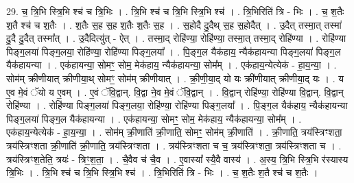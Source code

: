 \documentclass[17pt]{extarticle}
\begin{document}
29. च॒ त्रि॒भि स्त्रि॒भि श्च॑ च त्रि॒भिः । . त्रि॒भि श्च॑ च त्रि॒भि स्त्रि॒भि श्च॑ । . त्रि॒भिरिति॑ त्रि - भिः । . च॒ श॒तैः श॒तै श्च॑ च श॒तैः । . श॒तैः स॒ह स॒ह श॒तैः श॒तैः स॒ह । . स॒होदै दु॒दैथ् स॒ह स॒होदैत् । . उ॒दैत् तस्मा॒त् तस्मा॑ दु॒दै दु॒दैत् तस्मा᳚त् । . उ॒दैदित्यु॑त् - ऐत् । . तस्मा॒द् रोहि॑ण्या॒ रोहि॑ण्या॒ तस्मा॒त् तस्मा॒द् रोहि॑ण्या । . रोहि॑ण्या पिङ्ग॒लया॑ पिङ्ग॒लया॒ रोहि॑ण्या॒ रोहि॑ण्या पिङ्ग॒लया᳚ । . पि॒ङ्ग॒ल यैक॑हाय॒ न्यैक॑हायन्या पिङ्ग॒लया॑ पिङ्ग॒ल यैक॑हायन्या । . एक॑हायन्या॒ सोमꣳ॒॒ सोम॒ मेक॑हाय॒ न्यैक॑हायन्या॒ सोम᳚म् । . एक॑हाय॒न्येत्येक॑ - हा॒य॒न्या॒ । . सोम॑म् क्रीणीयात् क्रीणीया॒थ् सोमꣳ॒॒ सोम॑म् क्रीणीयात् । . क्री॒णी॒या॒द् यो यः क्री॑णीयात् क्रीणीया॒द् यः । . य ए॒व मे॒वं ॅयो य ए॒वम् । . ए॒वं ॅवि॒द्वान्. वि॒द्वा ने॒व मे॒वं ॅवि॒द्वान् । . वि॒द्वान् रोहि॑ण्या॒ रोहि॑ण्या वि॒द्वान्. वि॒द्वान् रोहि॑ण्या । . रोहि॑ण्या पिङ्ग॒लया॑ पिङ्ग॒लया॒ रोहि॑ण्या॒ रोहि॑ण्या पिङ्ग॒लया᳚ । . पि॒ङ्ग॒ल यैक॑हाय॒ न्यैक॑हायन्या पिङ्ग॒लया॑ पिङ्ग॒ल यैक॑हायन्या । . एक॑हायन्या॒ सोमꣳ॒॒ सोम॒ मेक॑हाय॒ न्यैक॑हायन्या॒ सोम᳚म् । . एक॑हाय॒न्येत्येक॑ - हा॒य॒न्या॒ । . सोम॑म् क्री॒णाति॑ क्री॒णाति॒ सोमꣳ॒॒ सोम॑म् क्री॒णाति॑ । . क्री॒णाति॒ त्रय॑स्त्रिꣳशता॒ त्रय॑स्त्रिꣳशता क्री॒णाति॑ क्री॒णाति॒ त्रय॑स्त्रिꣳशता । . त्रय॑स्त्रिꣳशता च च॒ त्रय॑स्त्रिꣳशता॒ त्रय॑स्त्रिꣳशता च । . त्रय॑स्त्रिꣳश॒तेति॒ त्रयः॑ - त्रिꣳ॒॒श॒ता॒ । . चै॒वैव च॑ चै॒व । . ए॒वास्या᳚ स्यै॒वै वास्य॑ । . अ॒स्य॒ त्रि॒भि स्त्रि॒भि र॑स्यास्य त्रि॒भिः । . त्रि॒भि श्च॑ च त्रि॒भि स्त्रि॒भि श्च॑ । . त्रि॒भिरिति॑ त्रि - भिः । . च॒ श॒तैः श॒तै श्च॑ च श॒तैः । \newline
\end{document}
